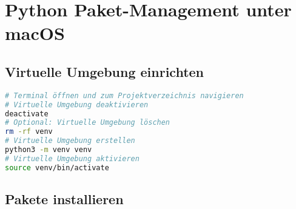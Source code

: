\documentclass{vorlage-design-main}
\title{}
\author{Jan Unger}
\date{\today}
\begin{document}
\maketitle

\begin{abstract}



\end{abstract}

\section{Python Paket-Management unter
macOS}\label{python-paket-management-unter-macos}

\subsection{Virtuelle Umgebung
einrichten}\label{virtuelle-umgebung-einrichten}

\begin{lstlisting}[language=bash]
# Terminal öffnen und zum Projektverzeichnis navigieren
# Virtuelle Umgebung deaktivieren
deactivate
# Optional: Virtuelle Umgebung löschen
rm -rf venv
# Virtuelle Umgebung erstellen
python3 -m venv venv
# Virtuelle Umgebung aktivieren
source venv/bin/activate
\end{lstlisting}

\subsection{Pakete installieren}\label{pakete-installieren}
\end{document}
